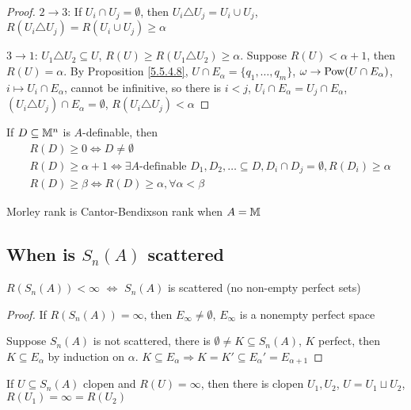 \documentclass[11pt]{article}
\begin{document}
\begin{proof}
\(2\to 3\): If \(U_i\cap U_j=\emptyset\), then \(U_i\triangle U_j=U_i\cup U_j\), \(R(U_i\triangle U_j)=R(U_i\cup U_j)\ge\alpha\)

\(3\to 1\): \(U_1\triangle U_2\subseteq U\), \(R(U)\ge R(U_1\triangle U_2)\ge\alpha\). Suppose \(R(U)<\alpha+1\), then \(R(U)=\alpha\). By
Proposition \ref{5.5.4.8}, \(U\cap E_\alpha=\{q_1,\dots,q_m\}\), \(\omega\to\operatorname{Pow}(U\cap E_\alpha)\), \(i\mapsto U_i\cap E_\alpha\), cannot be
infinitive, so there is \(i<j\), \(U_i\cap E_\alpha=U_j\cap E_\alpha\), \((U_i\triangle U_j)\cap E_\alpha=\emptyset\), \(R(U_i\triangle U_j)<\alpha\)
\end{proof}

If \(D\subseteq\mathbb{M}^n\) is \(A\)-definable, then
\begin{align*}
&R(D)\ge 0\Leftrightarrow D\neq\emptyset\\
&R(D)\ge\alpha+1\Leftrightarrow\exists A\text{-definable }D_1,D_2,\dots\subseteq D,D_i\cap D_j=\emptyset,R(D_i)\ge\alpha\\
&R(D)\ge\beta\Leftrightarrow R(D)\ge\alpha,\forall\alpha<\beta
\end{align*}

Morley rank is Cantor-Bendixson rank when \(A=\mathbb{M}\)
\subsection{When is \texorpdfstring{\(S_n(A)\)}{S_n(A)} scattered}
\label{sec:orgb192d72}
\begin{proposition}[]
\(R(S_n(A))<\infty\) \(\Leftrightarrow\) \(S_n(A)\) is scattered (no non-empty perfect sets)
\end{proposition}

\begin{proof}
If \(R(S_n(A))=\infty\), then \(E_\infty\neq\emptyset\), \(E_\infty\) is a nonempty perfect space

Suppose \(S_n(A)\) is not scattered, there is \(\emptyset\neq K\subseteq S_n(A)\), \(K\) perfect,
then \(K\subseteq E_\alpha\) by induction on \(\alpha\). \(K\subseteq E_\alpha\Rightarrow K=K'\subseteq E_\alpha'=E_{\alpha+1}\)
\end{proof}

\begin{lemma}[]
If \(U\subseteq S_n(A)\) clopen and \(R(U)=\infty\), then there is
clopen \(U_1,U_2\), \(U=U_1\sqcup U_2\), \(R(U_1)=\infty=R(U_2)\)
\end{lemma}
\end{document}
